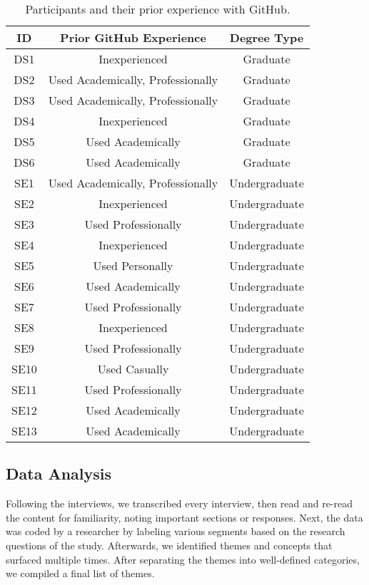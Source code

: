 \begin{table}[h]
    \vspace{1pt}
        \caption{Participants and their prior experience with GitHub.}\label{table:interviews:students}
    \vspace{1pt}
    \begin{center}
        \begin{tabular}{c | c | c}
            \hline
            ID & Prior GitHub Experience & Degree Type \\
            \hline
            DS1 & Inexperienced & Graduate \\ \hline
            DS2 & Used Academically, Professionally & Graduate \\ \hline
            DS3 & Used Academically, Professionally & Graduate \\ \hline
            DS4 & Inexperienced & Graduate \\ \hline
            DS5 & Used Academically & Graduate \\ \hline
            DS6 & Used Academically & Graduate \\ \hline
            SE1 & Used Academically, Professionally & Undergraduate \\ \hline
            SE2 & Inexperienced & Undergraduate \\ \hline
            SE3 & Used Professionally & Undergraduate \\ \hline
            SE4 & Inexperienced & Undergraduate \\ \hline
            SE5 & Used Personally & Undergraduate \\ \hline
            SE6 & Used Academically & Undergraduate \\ \hline
            SE7 & Used Professionally & Undergraduate \\ \hline
            SE8 & Inexperienced & Undergraduate \\ \hline
            SE9 & Used Professionally & Undergraduate \\ \hline
            SE10 & Used Casually & Undergraduate \\ \hline
            SE11 & Used Professionally & Undergraduate \\ \hline
            SE12 & Used Academically & Undergraduate \\ \hline
            SE13 & Used Academically & Undergraduate \\ \hline
        \end{tabular}
    \end{center}
\end{table}

\subsection{Data Analysis}
Following the interviews, we transcribed every interview, then read and re-read the content for familiarity, noting important sections or responses. Next, the data was coded by a researcher by labeling various segments based on the research questions of the study. Afterwards, we identified themes and concepts that surfaced multiple times. After separating the themes into well-defined categories, we compiled a final list of themes.
